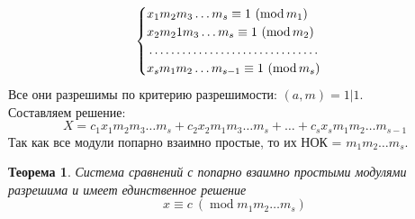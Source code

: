 \documentclass[a4paper, 12pt]{article}
\newtheorem*{theorem}{Теорема}
\renewcommand{\mod}{\operatorname{mod}}
\begin{document}
    $$\begin{cases}
           x_1m_2m_3\dots m_s \equiv 1 \ (\mod m_1)\\
           x_2m_21m_3\dots m_s \equiv 1 \ (\mod m_2)\\
           \dotfill\\
           x_sm_1m_2\dots m_{s-1} \equiv 1 \ (\mod m_s)
    \end{cases}$$
    Все они разрешимы по критерию разрешимости: $(a, m) = 1 | 1$.\\
    Составляем решение:
    $$X = c_1x_1m_2m_3\dots m_s + c_2x_2m_1m_3\dots m_s + \dots + c_sx_sm_1m_2\dots m_{s-1}$$
    Так как все модули попарно взаимно простые, то их НОК = $m_1m_2\dots m_s$.\\
    \begin{theorem}
        Система сравнений с попарно взаимно простыми модулями разрешима и имеет единственное решение
        $$x \equiv c \ (\mod m_1m_2 \dots m_s)$$
    \end{theorem}
\end{document}
